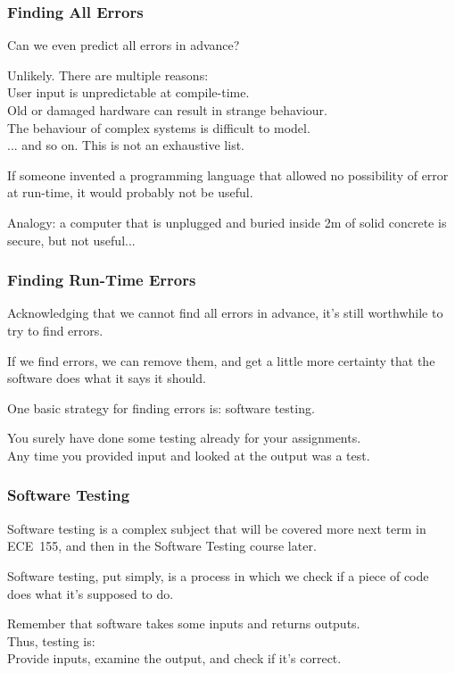 \begin{frame}
\frametitle{Finding All Errors}
Can we even predict all errors in advance?

Unlikely. There are multiple reasons:\\
\quad User input is unpredictable at compile-time.\\
\quad Old or damaged hardware can result in strange behaviour.\\
\quad The behaviour of complex systems is difficult to model.\\
\quad ... and so on. This is not an exhaustive list.

If someone invented a programming language that allowed no possibility of error at run-time, it would probably not be useful.

Analogy: a computer that is unplugged and buried inside 2m of solid concrete is secure, but not useful...

\end{frame}

\begin{frame}
\frametitle{Finding Run-Time Errors}
Acknowledging that we cannot find all errors in advance, it's still worthwhile to try to find errors.

If we find errors, we can remove them, and get a little more certainty that the software does what it says it should.

One basic strategy for finding errors is: \alert{software testing}.

You surely have done some testing already for your assignments.\\
\quad Any time you provided input and looked at the output was a test.

\end{frame}

\begin{frame}
\frametitle{Software Testing}
Software testing is a complex subject that will be covered more next term in ECE~155, and then in the Software Testing course later.

Software testing, put simply, is a process in which we check if a piece of code does what it's supposed to do.

Remember that software takes some inputs and returns outputs.\\
\quad Thus, testing is:\\
\quad \quad Provide inputs, examine the output, and check if it's correct.

\end{frame}

